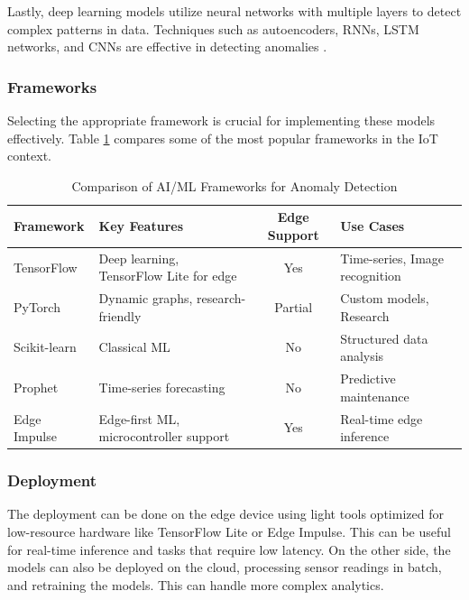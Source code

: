 Lastly, deep learning models utilize neural networks with multiple layers
to detect complex patterns in data. Techniques such as autoencoders, \gls{RNNs},
\gls{LSTM} networks, and \gls{CNNs} are effective in detecting anomalies \cite{BHAROT2024574}.

\subsubsection{Frameworks}
Selecting the appropriate framework is crucial for implementing these models
effectively. Table \ref{tab:ai-ml:frameworks}
compares some of the most popular frameworks in the \gls{IoT} context.

\begin{table}[ht]
	\centering
	\caption{Comparison of \gls{AI}/\gls{ML} Frameworks for Anomaly Detection}
	\label{tab:ai-ml:frameworks}
	\begin{tabular}{p{3cm}p{4cm}cp{4cm}}
		\toprule
		\textbf{Framework} & \textbf{Key Features}                        & \textbf{Edge Support} & \textbf{Use Cases}             \\
		\midrule
		TensorFlow         & Deep learning, TensorFlow Lite for edge      & Yes                   & Time-series, Image recognition \\
		\midrule
		PyTorch            & Dynamic graphs, research-friendly            & Partial               & Custom models, Research        \\
		\midrule
		Scikit-learn       & Classical \gls{ML}                           & No                    & Structured data analysis       \\
		\midrule
		Prophet            & Time-series forecasting                      & No                    & Predictive maintenance         \\
		\midrule
		Edge Impulse       & Edge-first \gls{ML}, microcontroller support & Yes                   & Real-time edge inference       \\
		\bottomrule
	\end{tabular}
\end{table}

\subsubsection{Deployment}

The deployment can be done on the edge device using light tools optimized for
low-resource hardware like TensorFlow Lite or Edge Impulse. This can be useful
for real-time inference and tasks that require low latency.
On the other side, the models can also be deployed on the cloud, processing
sensor readings in batch, and retraining the models. This can handle more
complex analytics.

